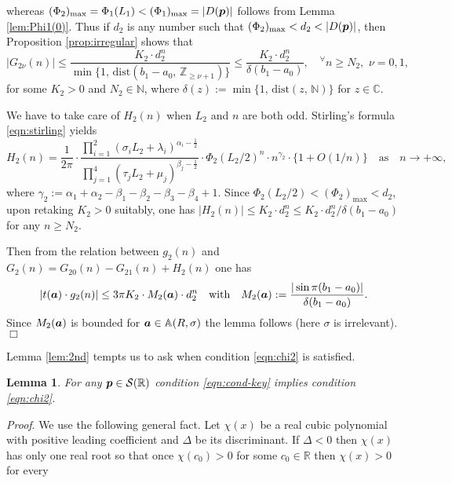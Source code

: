 \documentclass[a4paper,12pt]{article}
\theoremstyle{plain}
\newtheorem{lemma}[theorem]{Lemma}
\def\A{\mathbb{A}}
\def\C{\mathbb{C}}
\def\N{\mathbb{N}}
\def\R{\mathbb{R}}
\def\Z{\mathbb{Z}}
\def\cS{\mathcal{S}}
\def\vD{\varDelta}
\def\ba{\mbox{\boldmath $a$}}
\def\bp{\mbox{\boldmath $p$}}
\begin{document}
whereas $(\Phi_2)_{\mathrm{max}} = \Phi_1(L_1) < (\Phi_1)_{\mathrm{max}} 
= |D(\bp)|$ follows from Lemma \ref{lem:Phi1(0)}. 
Thus if $d_2$ is any number such that $(\Phi_2)_{\mathrm{max}} 
< d_2 < |D(\bp)|$, then Proposition \ref{prop:irregular} shows that 
\[
|G_{2\nu}(n)| \le \dfrac{K_2 \cdot d_2^n}{ \min \{1, \, 
\mathrm{dist}(b_1-a_0, \, \Z_{\ge \nu+1}) \}} 
\le \dfrac{K_2 \cdot d_2^n}{\delta(b_1-a_0)}, 
\quad {}^{\forall} n \ge N_2, \,\, \nu = 0, 1,  
\]
for some $K_2 > 0$ and $N_2 \in \N$, where $\delta(z) := \min \{ 1, \, 
\mathrm{dist}(z, \, \N)\}$ for $z \in \C$.  
\par
We have to take care of $H_2(n)$ when $L_2$ and $n$ are both odd. 
Stirling's formula \eqref{eqn:stirling} yields 
\[
H_2(n) = \frac{1}{2 \pi} \cdot \frac{\prod_{i=1}^2 
(\sigma_i L_2 + \lambda_i)^{\alpha_i- \frac{1}{2}} }{ \prod_{j=1}^4 
(\tau_j L_2 + \mu_j)^{\beta_j - \frac{1}{2} } } 
\cdot \Phi_2(L_2/2)^n \cdot n^{\gamma_2} \cdot \{1 + O(1/n) \} 
\quad \mbox{as} \quad n \to +\infty, 
\]
where $\gamma_2 := \alpha_1+\alpha_2-\beta_1-\beta_2-\beta_3-\beta_4+1$. 
Since $\Phi_2(L_2/2) < (\Phi_2)_{\mathrm{max}} < d_2$, upon retaking $K_2 > 0$ 
suitably, one has $|H_2(n)| \le K_2 \cdot d_2^n \le K_2 \cdot 
d_2^n/ \delta(b_1-a_0)$ for any $n \ge N_2$.  
\par
Then from the relation between $g_2(n)$ and 
$G_2(n) = G_{20}(n)-G_{21}(n) + H_2(n)$ one has   
\[
|t(\ba) \cdot g_2(n) | \le 3 \pi K_2 \cdot M_2(\ba) \cdot d_2^n  
\quad \mbox{with} \quad  
M_2(\ba) := \dfrac{|\sin \pi(b_1-a_0)|}{\delta(b_1-a_0)}.  
\]
Since $M_2(\ba)$ is bounded for $\ba \in \A(R, \sigma)$ the lemma 
follows (here $\sigma$ is irrelevant). \hfill $\Box$ \par\medskip
Lemma \ref{lem:2nd} tempts us to ask when condition \eqref{eqn:chi2} 
is satisfied.   
\begin{lemma}  \label{lem:key} 
For any $\bp \in \cS(\R)$ condition \eqref{eqn:cond-key} implies 
condition \eqref{eqn:chi2}.  
\end{lemma} 
{\it Proof}. 
We use the following general fact. 
Let $\chi(x)$ be a real cubic polynomial with positive leading coefficient 
and $\vD$ be its discriminant. 
If $\vD < 0$ then $\chi(x)$ has only one real root so that once 
$\chi(c_0) > 0$ for some $c_0 \in \R$ then $\chi(x) > 0$ for every 
\end{document}
